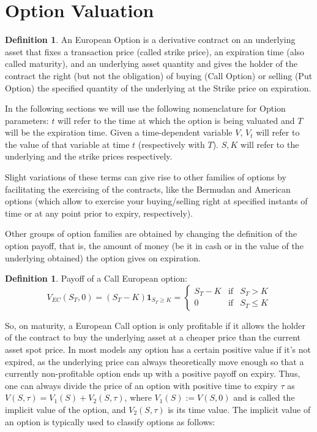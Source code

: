 \documentclass[12,twoside]{mammeTFM}
\theoremstyle{definition}
\newtheorem{definition}[thm]{Definition}
\theoremstyle{remark}
\begin{document}
\section{Option Valuation}\label{chapter:option_valuation}

\begin{definition}
An European Option is a derivative contract on an underlying asset that fixes a transaction price (called strike price), an expiration time (also called maturity), and an underlying asset quantity and gives the holder of the contract the right (but not the obligation) of buying (Call Option) or selling (Put Option) the specified quantity of the underlying at the Strike price on expiration.
\end{definition}

In the following sections we will use the following nomenclature for Option parameters: $t$ will refer to the time at which the option is being valuated and $T$ will be the expiration time. Given a time-dependent variable $V$, $V_t$ will refer to the value of that variable at time $t$ (respectively with $T$). $S, K$ will refer to the underlying and the strike prices respectively.

Slight variations of these terms can give rise to other families of options by facilitating the exercising of the contracts, like the Bermudan and American options (which allow to exercise your buying/selling right at specified instants of time or at any point prior to expiry, respectively).

Other groups of option families are obtained by changing the definition of the option payoff, that is, the amount of money (be it in cash or in the value of the underlying obtained) the option gives on expiration.

\begin{definition} Payoff of a Call European option:
\begin{equation} \label{eq:european_call_payoff}
V_{EC}(S_T, 0) = (S_T - K)\boldsymbol{1}_{S_T \geq K} = \left\{ \begin{array}{rcl}
S_T - K & \mbox{if} & S_T > K \\ 
0 & \mbox{if} & S_T\leq K
\end{array}\right.
\end{equation} 
\end{definition}

So, on maturity, a European Call option is only profitable if it allows the holder of the contract to buy the underlying asset at a cheaper price than the current asset spot price. In most models any option has a certain positive value if it's not expired, as the underlying price can always theoretically move enough so that a currently non-profitable option ends up with a positive payoff on expiry. Thus, one can always divide the price of an option with positive time to expiry $\tau$ as $V(S,\tau) = V_1(S) + V_2(S, \tau)$, where $V_1(S) := V(S,0)$ and is called the implicit value of the option, and $V_2(S, \tau)$ is its time value. The implicit value of an option is typically used to classify options as follows:
\end{document}
